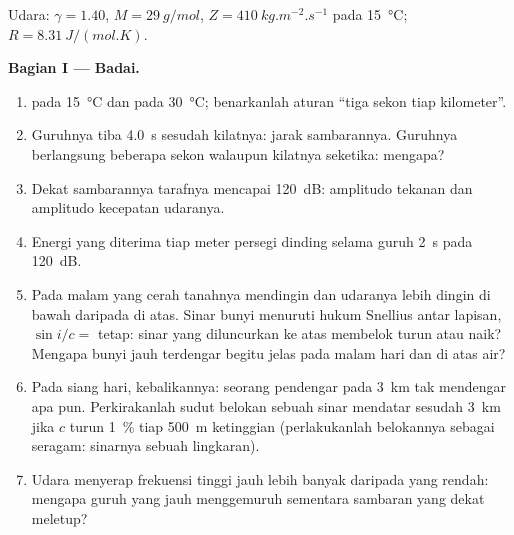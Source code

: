 \begin{problem}
\label{pb:b2:sound-waves:1}

Udara: $\gamma = 1.40$, $M = \qty{29}{g/mol}$, $Z = \qty{410}{kg.m^{-2}.s^{-1}}$ pada
\qty{15}{\degreeCelsius}; $R = \qty{8.31}{J/(mol.K)}$.

\medskip
\noindent\textbf{Bagian I --- Badai.}
\begin{enumerate}
  \item {} pada \qty{15}{\degreeCelsius} dan pada \qty{30}{\degreeCelsius};
        benarkanlah aturan ``tiga sekon tiap kilometer''.
  \item Guruhnya tiba \qty{4.0}{s} sesudah kilatnya: jarak
        sambarannya. Guruhnya berlangsung beberapa sekon walaupun kilatnya
        seketika: mengapa?
  \item Dekat sambarannya tarafnya mencapai \qty{120}{dB}: amplitudo tekanan
        dan amplitudo kecepatan udaranya.
  \item Energi yang diterima tiap meter persegi dinding selama guruh
        \qty{2}{s} pada \qty{120}{dB}.
  \item Pada malam yang cerah tanahnya mendingin dan udaranya lebih dingin di bawah
        daripada di atas. Sinar bunyi menuruti hukum Snellius antar lapisan,
        $\sin i/c =$ tetap: sinar yang diluncurkan ke atas membelok turun atau naik?
        Mengapa bunyi jauh terdengar begitu jelas pada malam hari dan di atas air?
  \item Pada siang hari, kebalikannya: seorang pendengar pada \qty{3}{km} tak mendengar apa pun.
        Perkirakanlah sudut belokan sebuah sinar mendatar sesudah
        \qty{3}{km} jika $c$ turun \qty{1}{\%} tiap \qty{500}{m} ketinggian
        (perlakukanlah belokannya sebagai seragam: sinarnya sebuah lingkaran).

  \item Udara menyerap frekuensi tinggi jauh lebih banyak daripada yang rendah: mengapa
        guruh yang jauh menggemuruh sementara sambaran yang dekat meletup?
\end{enumerate}


\end{problem}
